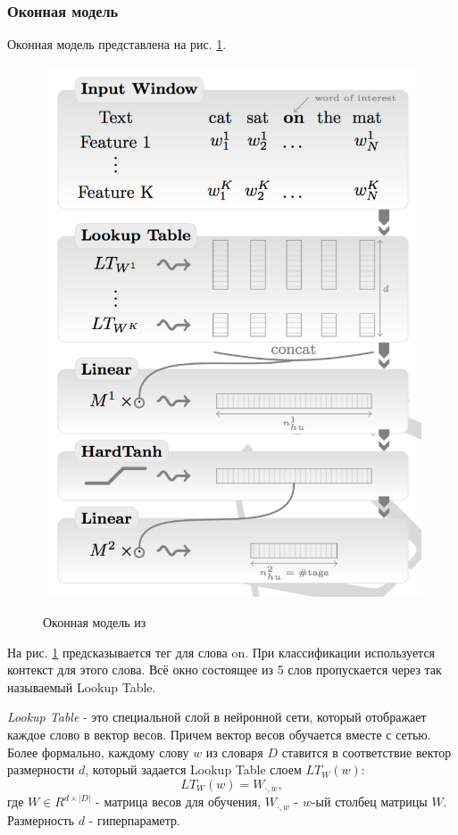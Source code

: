   \subsubsection{Оконная модель} \label{subsubsection:window}
  Оконная модель представлена на рис. \ref{figure:window_net}.
  \newpage
  \begin{figure}[!h]
    \centering
    \caption{Оконная модель из \citep{collobert2011natural}}
    \includegraphics{figures/window.png}
    \label{figure:window_net}
  \end{figure}

  На рис. \ref{figure:window_net} предсказывается тег для слова on.
  При классификации используется контекст для этого слова.
  Всё окно состоящее из 5 слов пропускается через так называемый Lookup Table.

  \textit{Lookup Table} - это специальной слой в нейронной сети, который
  отображает каждое слово в вектор весов. Причем вектор весов обучается вместе с сетью.
  Более формально, каждому слову $w$ из словаря $D$ ставится в соответствие
  вектор размерности $d$, который задается Lookup Table слоем $LT_W(w)$:
  \[
    LT_W(w) = W_{\cdot,w},
  \]
  где $W \in R^{d\times|D|}$ - матрица весов для обучения, $W_{\cdot,w}$ - $w$-ый столбец
  матрицы $W$. Размерность $d$ - гиперпараметр.

